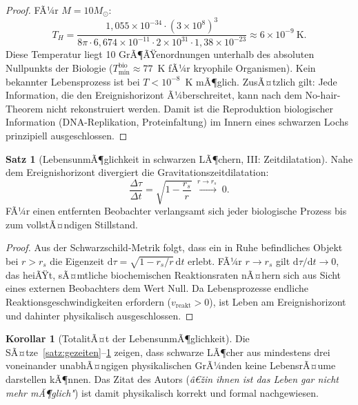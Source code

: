 ﻿\documentclass[a4paper,12pt]{article}
\theoremstyle{definition}
\newtheorem{satz}{Satz}
\newtheorem{korollar}{Korollar}
\begin{document}
\begin{proof}
    FÃ¼r $M = 10 M_\odot$:
    \[
        T_H = \frac{1{,}055\times10^{-34} \cdot (3\times10^8)^3}
              {8\pi \cdot 6{,}674\times10^{-11} \cdot 2\times10^{31}
              \cdot 1{,}38\times10^{-23}}
        \approx 6 \times 10^{-9}~\text{K}.
    \]
    Diese Temperatur liegt 10 GrÃ¶ÃŸenordnungen unterhalb des
    absoluten Nullpunkts der Biologie ($T_{\min}^{\text{bio}} \approx 77$~K
    fÃ¼r kryophile Organismen). Kein bekannter Lebensprozess ist bei
    $T < 10^{-8}$~K mÃ¶glich. ZusÃ¤tzlich gilt: Jede Information, die den
    Ereignishorizont Ã¼berschreitet, kann nach dem
    No-hair-Theorem nicht rekonstruiert werden. Damit ist die
    Reproduktion biologischer Information (DNA-Replikation, Proteinfaltung)
    im Innern eines schwarzen Lochs prinzipiell ausgeschlossen. \qedhere
\end{proof}

\begin{satz}[LebensunmÃ¶glichkeit in schwarzen LÃ¶chern, III: Zeitdilatation]
\label{satz:zeitdilatation}
    Nahe dem Ereignishorizont divergiert die Gravitationszeitdilatation:
    \[
        \frac{\Delta \tau}{\Delta t} = \sqrt{1 - \frac{r_s}{r}} \;\xrightarrow{r \to r_s}\; 0.
    \]
    FÃ¼r einen entfernten Beobachter verlangsamt sich jeder biologische
    Prozess bis zum vollstÃ¤ndigen Stillstand.
\end{satz}

\begin{proof}
    Aus der Schwarzschild-Metrik folgt, dass ein in Ruhe befindliches
    Objekt bei $r > r_s$ die Eigenzeit
    $\mathrm{d}\tau = \sqrt{1 - r_s/r}\,\mathrm{d}t$
    erlebt. FÃ¼r $r \to r_s$ gilt $\mathrm{d}\tau/\mathrm{d}t \to 0$,
    das heiÃŸt, sÃ¤mtliche biochemischen Reaktionsraten nÃ¤hern sich aus Sicht
    eines externen Beobachters dem Wert Null. Da Lebensprozesse endliche
    Reaktionsgeschwindigkeiten erfordern ($v_{\text{reakt}} > 0$), ist Leben
    am Ereignishorizont und dahinter physikalisch ausgeschlossen. \qedhere
\end{proof}

\begin{korollar}[TotalitÃ¤t der LebensunmÃ¶glichkeit]
    Die SÃ¤tze~\ref{satz:gezeiten}--\ref{satz:zeitdilatation} zeigen, dass
    schwarze LÃ¶cher aus mindestens drei voneinander unabhÃ¤ngigen physikalischen
    GrÃ¼nden keine LebensrÃ¤ume darstellen kÃ¶nnen. Das Zitat des Autors
    (\emph{â€žin ihnen ist das Leben gar nicht mehr mÃ¶glich"}) ist damit
    physikalisch korrekt und formal nachgewiesen.
\end{korollar}
\end{document}
